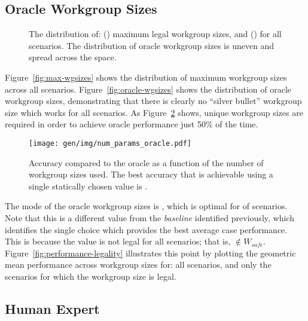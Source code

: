 \subsection{Oracle Workgroup Sizes}

\begin{figure}

\caption{%
  The distribution of: () maximum legal
  workgroup sizes, and () for all
  scenarios. The distribution of oracle workgroup sizes is uneven and
  spread across the space. %
}
\label{fig:heatmaps}
\end{figure}

Figure~\ref{fig:max-wgsizes} shows the distribution of maximum
workgroup sizes across all scenarios. Figure~\ref{fig:oracle-wgsizes}
shows the distribution of oracle workgroup sizes, demonstrating that
there is clearly no ``silver bullet'' workgroup size which works for
all scenarios. As Figure~\ref{fig:oracle-accuracy} shows,
 unique workgroup sizes are
required in order to achieve oracle performance just 50\% of the
time.

\begin{figure}
\centering
\texttt{[image: gen/img/num\_params\_oracle.pdf]}
\caption{%
  Accuracy compared to the oracle as a function of the number of
  workgroup sizes used. The best accuracy that is achievable using a
  single statically chosen value is
  \protect.%
}
\label{fig:oracle-accuracy}
\end{figure}

The mode of the oracle workgroup sizes is
, which is optimal for
 of scenarios. Note that this is
a different value from the \emph{baseline} identified previously,
which identifies the single choice which provides the best average
case performance. This is because the value is not legal for all
scenarios; that is, $ \not\in W_{safe}$.
Figure~\ref{fig:performance-legality} illustrates this point by
plotting the geometric mean performance across workgroup sizes for:
all scenarios, and only the scenarios for which the workgroup size is
legal.




\subsection{Human Expert}


